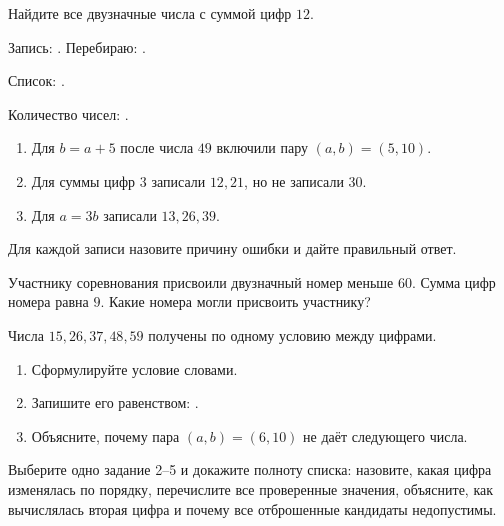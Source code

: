 \begin{practicebox}
  Найдите все двузначные числа с суммой цифр \(12\).

  Запись: \answerblank[32mm]. Перебираю: \answerblank[18mm].

  Список: \answerblank[100mm].

  Количество чисел: \answerblank[15mm].
\end{practicebox}

\begin{warningbox}
  \begin{enumerate}[label=\textbf{\arabic*.}]
    \item Для \(b=a+5\) после числа \(49\) включили пару \((a,b)=(5,10)\).
    \item Для суммы цифр \(3\) записали \(12,21\), но не записали \(30\).
    \item Для \(a=3b\) записали \(13,26,39\).
  \end{enumerate}
  Для каждой записи назовите причину ошибки и дайте правильный ответ.
\end{warningbox}

\newpage
\begin{practicebox}
  Участнику соревнования присвоили двузначный номер меньше \(60\). Сумма цифр
  номера равна \(9\). Какие номера могли присвоить участнику?
\end{practicebox}

\begin{practicebox}
  Числа \(15,26,37,48,59\) получены по одному условию между цифрами.
  \begin{enumerate}[label=\textbf{\arabic*.}]
    \item Сформулируйте условие словами. 
    \item Запишите его равенством: \answerblank[38mm].
    \item Объясните, почему пара \((a,b)=(6,10)\) не даёт следующего числа.
  \end{enumerate}
\end{practicebox}

\begin{checkpointbox}
  Выберите одно задание 2--5 и докажите полноту списка: назовите, какая цифра
  изменялась по порядку, перечислите все проверенные значения, объясните, как
  вычислялась вторая цифра и почему все отброшенные кандидаты недопустимы.
\end{checkpointbox}
